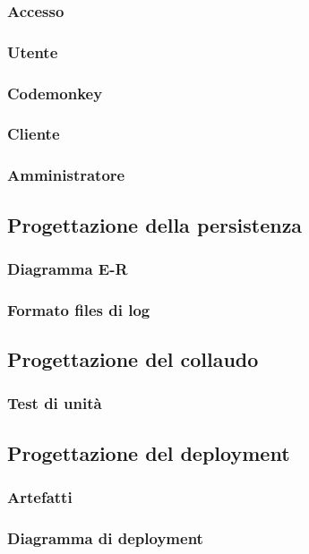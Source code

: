 \documentclass{article}
\begin{document}
\subsubsection{Accesso}

\subsubsection{Utente}

\subsubsection{Codemonkey}

\subsubsection{Cliente}

\subsubsection{Amministratore}


\subsection{Progettazione della persistenza}
\subsubsection{Diagramma E-R}

\subsubsection{Formato files di log}


\subsection{Progettazione del collaudo}
\subsubsection{Test di unità}


\subsection{Progettazione del deployment}
\subsubsection{Artefatti}



\subsubsection{Diagramma di deployment}

\end{document}
